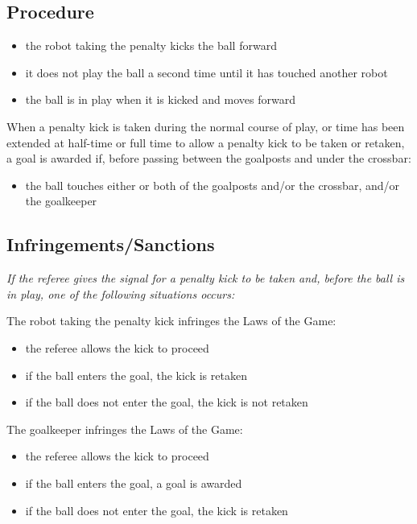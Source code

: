 \subsection{Procedure}
\begin{itemize}
\item the robot taking the penalty kicks the ball forward
\item it does not play the ball a second time until it has touched another robot
\item the ball is in play when it is kicked and moves forward
\end{itemize}

When a penalty kick is taken during the normal course of play, or time has been extended at half-time or full time to allow a penalty kick to be taken or retaken, a goal is awarded if, before passing between the goalposts and under the crossbar:

\begin{itemize}
\item the ball touches either or both of the goalposts and/or the crossbar, and/or the goalkeeper
\end{itemize}

\subsection{Infringements/Sanctions}
\textit{If the referee gives the signal for a penalty kick to be taken and, before the ball is in play, one of the following situations occurs:}

The robot taking the penalty kick infringes the Laws of the Game:

\begin{itemize}
\item the referee allows the kick to proceed
\item if the ball enters the goal, the kick is retaken
\item if the ball does not enter the goal, the kick is not retaken
\end{itemize}

The goalkeeper infringes the Laws of the Game:

\begin{itemize}
\item the referee allows the kick to proceed
\item if the ball enters the goal, a goal is awarded
\item if the ball does not enter the goal, the kick is retaken
\end{itemize}

